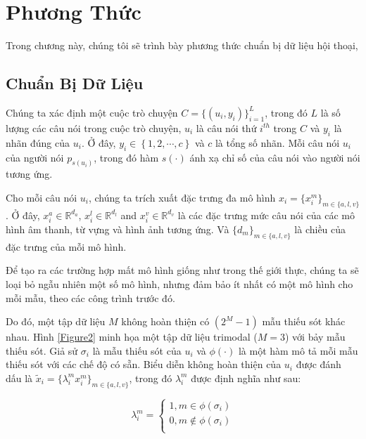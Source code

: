 \chapter{Phương Thức}
\label{chap:Phương Thức}

Trong chương này, chúng tôi sẽ trình bày phương thức chuẩn bị dữ liệu hội thoại, 

\section{Chuẩn Bị Dữ Liệu}

Chúng ta xác định một cuộc trò chuyện $C=\{ \left(u_{i}, y_{i}\right)\}_{i=1}^{L}$, trong đó $L$ là số lượng các câu nói trong cuộc trò chuyện, $u_{i}$ là câu nói thứ $i^{th}$ trong $C$ và $y_{i}$ là nhãn đúng của $u_{i}$. 
Ở đây, $y_{i} \in \left\{1,2,\cdots, c\right\}$ và $c$ là tổng số nhãn. 
Mỗi câu nói $u_{i}$ của người nói $p_{s(u_i)}$, trong đó hàm $s(\cdot)$ ánh xạ chỉ số của câu nói vào người nói tương ứng. 

Cho mỗi câu nói $u_{i}$, chúng ta trích xuất đặc trưng đa mô hình $x_{i}=\{{x}_{i}^m\}_{m\in\{a, l, v\}}$. 
Ở đây, $x_{i}^a \in \mathbb{R}^{d_a}$, $x_{i}^l \in \mathbb{R}^{d_l}$ and $x_{i}^v \in \mathbb{R}^{d_v}$ là các đặc trưng mức câu nói của các mô hình âm thanh, từ vựng và hình ảnh tương ứng.
Và $\{d_{m}\}_{m\in\{a, l, v\}}$ là chiều của đặc trưng của mỗi mô hình.

Để tạo ra các trường hợp mất mô hình giống như trong thế giới thực, chúng ta sẽ loại bỏ ngẫu nhiên một số mô hình, nhưng đảm bảo ít nhất có một mô hình cho mỗi mẫu, theo các công trình trước đó.


Do đó, một tập dữ liệu $M$ không hoàn thiện có $\left(2^{M}-1\right)$ mẫu thiếu sót khác nhau. 
Hình \ref{Figure2} minh họa một tập dữ liệu trimodal ($M=3$) với bảy mẫu thiếu sót. 
Giả sử $\sigma_{i}$ là mẫu thiếu sót của $u_{i}$ và $\phi(\cdot)$ là một hàm mô tả mỗi mẫu thiếu sót với các chế độ có sẵn. 
Biểu diễn không hoàn thiện của $u_{i}$ được đánh dấu là $\widetilde{x}_{i}=\{{\lambda}_{i}^m{x}_{i}^m\}_{m\in\{a, l, v\}}$, trong đó ${\lambda}_{i}^m$ được định nghĩa như sau:

\begin{equation}
	\label{eq1}
	{\lambda}_{i}^m=\begin{cases}
	1, m\in\phi(\sigma_{i}) \\
	0, m\notin\phi(\sigma_{i}) \\
	\end{cases}
\end{equation}




